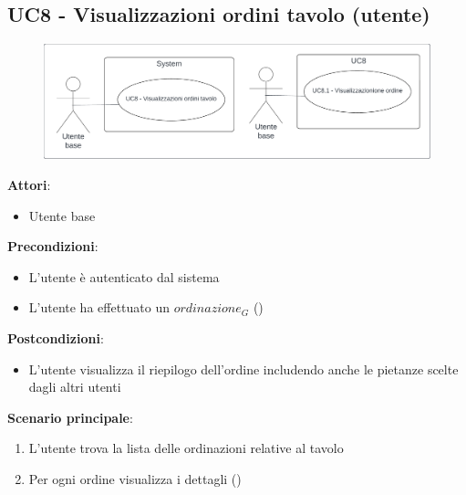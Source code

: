 \subsection{UC8 - Visualizzazioni ordini tavolo (utente)}\label{usecase:8}
\begin{figure}[H]
    \centering
    \includegraphics[width=0.9\linewidth]{ucd/ucd8.png}
\end{figure}
\textbf{Attori}:
\begin{itemize}
    \item Utente base
\end{itemize}
\textbf{Precondizioni}:
\begin{itemize}
    \item L'utente è autenticato dal sistema
    \item L'utente ha effettuato un $\textit{ordinazione}_G$ ()
\end{itemize}
\textbf{Postcondizioni}:
\begin{itemize}
    \item L'utente visualizza il riepilogo dell'ordine includendo anche le pietanze scelte dagli altri utenti
\end{itemize}
\textbf{Scenario principale}:
\begin{enumerate}
    \item L'utente trova la lista delle ordinazioni relative al tavolo
    \item Per ogni ordine visualizza i dettagli ()
\end{enumerate}
